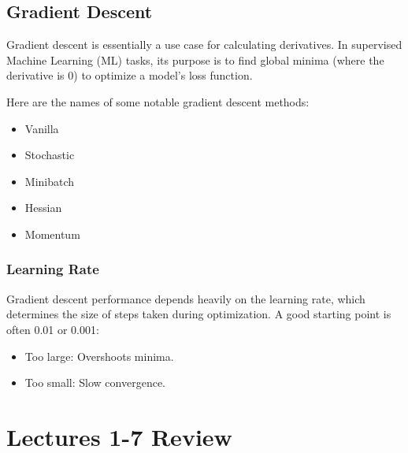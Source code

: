 \subsection{Gradient Descent}
Gradient descent \cite{goodfellow2016deep} is essentially a use case for calculating derivatives. In supervised Machine Learning (ML) tasks, its purpose is to find global minima (where the derivative is 0) to optimize a model's loss function. %

Here are the names of some notable gradient descent methods:
\begin{itemize}
    \item Vanilla
    \item Stochastic
    \item Minibatch
    \item Hessian
    \item Momentum
\end{itemize}

\subsubsection{Learning Rate}
Gradient descent performance depends heavily on the learning rate, which determines the size of steps taken during optimization. A good starting point is often 0.01 or 0.001:
\begin{itemize}
    \item Too large: Overshoots minima.
    \item Too small: Slow convergence.
\end{itemize}

\section{Lectures 1-7 Review}

